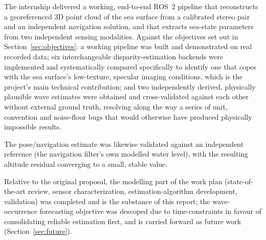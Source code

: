 \label{sec:results}

The internship delivered a working, end-to-end ROS~2 pipeline that reconstructs a georeferenced 3D point cloud of the sea surface from a calibrated stereo pair and an independent navigation solution, and that extracts sea-state parameters from two independent sensing modalities. Against the objectives set out in Section~\ref{sec:objectives}: a working pipeline was built and demonstrated on real recorded data; six interchangeable disparity-estimation backends were implemented and systematically compared specifically to identify one that copes with the sea surface's low-texture, specular imaging conditions, which is the project's main technical contribution; and two independently derived, physically plausible wave estimates were obtained and cross-validated against each other without external ground truth, resolving along the way a series of unit, convention and noise-floor bugs that would otherwise have produced physically impossible results.

The pose/navigation estimate was likewise validated against an independent reference (the navigation filter's own modelled water level), with the resulting altitude residual converging to a small, stable value.

Relative to the original proposal, the modelling part of the work plan (state-of-the-art review, sensor characterization, estimation-algorithm development, validation) was completed and is the substance of this report; the wave-occurrence forecasting objective was descoped due to time-constraints in favour of consolidating reliable estimation first, and is carried forward as future work (Section~\ref{sec:future}).
